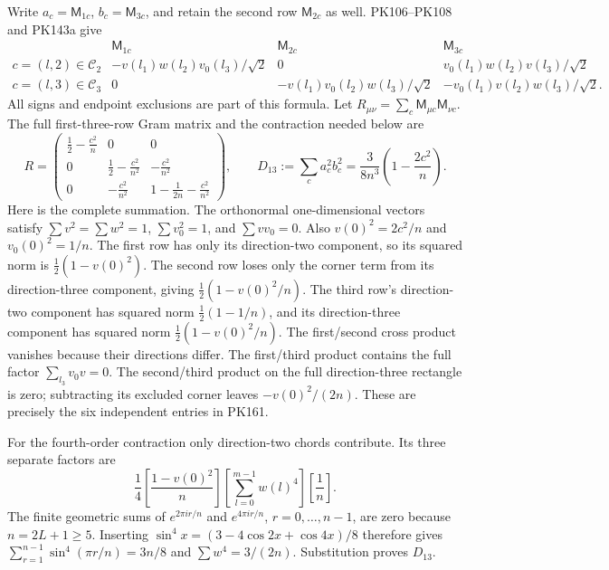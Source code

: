 \documentclass[11pt]{article}
\begin{document}
Write \(a_c=\mathsf M_{1c}\), \(b_c=\mathsf M_{3c}\), and retain
the second row \(\mathsf M_{2c}\) as well. PK106–PK108 and PK143a give
\[
 \begin{array}{c|ccc}
 &\mathsf M_{1c}&\mathsf M_{2c}&\mathsf M_{3c}\\ \hline
 c=(l,2)\in\mathcal C_2
 &-v(l_1)w(l_2)v_0(l_3)/\sqrt2&0&
                  v_0(l_1)w(l_2)v(l_3)/\sqrt2\\
 c=(l,3)\in\mathcal C_3
 &0&-v(l_1)v_0(l_2)w(l_3)/\sqrt2&
                  -v_0(l_1)v(l_2)w(l_3)/\sqrt2 .
 \end{array}\tag{PK160}
\]
All signs and endpoint exclusions are part of this formula.
Let \(R_{\mu\nu}=\sum_c\mathsf M_{\mu c}\mathsf M_{\nu c}\).
The full first-three-row Gram matrix and the contraction needed below are
\[
 R=
 \begin{pmatrix}
 \frac12-\frac{c^2}{n}&0&0\\
 0&\frac12-\frac{c^2}{n^2}&-\frac{c^2}{n^2}\\
 0&-\frac{c^2}{n^2}&1-\frac1{2n}-\frac{c^2}{n^2}
 \end{pmatrix},\qquad
 D_{13}:=\sum_ca_c^2b_c^2
       =\frac{3}{8n^3}\left(1-\frac{2c^2}{n}\right).
 \tag{PK161}
\]
Here is the complete summation. The orthonormal one-dimensional
vectors satisfy
\(\sum v^2=\sum w^2=1\), \(\sum v_0^2=1\), and
\(\sum vv_0=0\). Also \(v(0)^2=2c^2/n\) and \(v_0(0)^2=1/n\).
The first row has only its direction-two component, so its squared
norm is \(\frac12(1-v(0)^2)\). The second row loses only the
corner term from its direction-three component, giving
\(\frac12(1-v(0)^2/n)\). The third row's direction-two component
has squared norm \(\frac12(1-1/n)\), and its direction-three
component has squared norm \(\frac12(1-v(0)^2/n)\).
The first/second cross product vanishes because their directions differ.
The first/third product contains the full factor \(\sum_{l_3}v_0v=0\).
The second/third product on the full direction-three rectangle is zero;
subtracting its excluded corner leaves \(-v(0)^2/(2n)\).
These are precisely the six independent entries in PK161.

For the fourth-order contraction only direction-two chords contribute.
Its three separate factors are
\[
 \frac14\left[\frac{1-v(0)^2}{n}\right]
       \left[\sum_{l=0}^{m-1}w(l)^4\right]\left[\frac1n\right].
\]
The finite geometric sums of \(e^{2\pi ir/n}\) and
\(e^{4\pi ir/n}\), \(r=0,\ldots,n-1\), are zero because
\(n=2L+1\ge5\). Inserting
\(\sin^4 x=(3-4\cos2x+\cos4x)/8\) therefore gives
\(\sum_{r=1}^{n-1}\sin^4(\pi r/n)=3n/8\) and
\(\sum w^4=3/(2n)\). Substitution proves \(D_{13}\).
\end{document}
